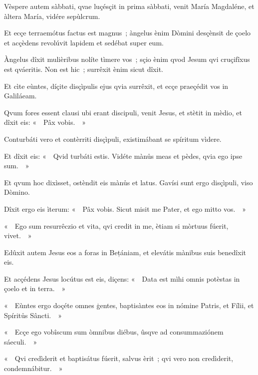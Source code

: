 
Vèspere autem sàbbati, qvae luçésçit in prima sàbbati, venit María Magdaléne, et àltera María, vidére sepùlcrum.

Et ecçe terraemótus factus est magnus~; àngelus ènim Dòmini desçènsit de çoelo et acçèdens revolúvit lapidem et sedébat super eum.

Àngelus dîxit mulièribus nolíte tìmere vos~; sçio ènim qvod Jesum qvi cruçifîxus est qváeritis. Non est hic~; surrêxit ènim sicut dîxit.

Et cìte eùntes, díçite disçìpulis ejus qvia surrêxit, et ecçe praeçédit vos in Galiláeam.

Qvum fores essent clausi ubi erant discipuli, venit Jesus, et stètit in mèdio, et dîxit eis: «~~Pâx vobis.~~»

Conturbáti vero et contèrriti disçìpuli, existimábant se spíritum vìdere.

Et dîxit eis: «~~Qvid turbáti estis. Vidéte mànůs meas et pèdes, qvia ego ipse sum.~~»

Et qvum hoc dixìsset, ostèndit eis mànůs et latus. Gavísi sunt ergo disçìpuli, viso Dòmino.

Dîxit ergo eis ìterum: «~~Pâx vobis. Sicut misit me Pater, et ego mitto vos.~~»

«~~Ego sum resurrêczio et vita, qvi credit in me, ètiam si mòrtuus fúerit, vivet.~~»


Edûxit autem Jesus eos a foras in Bețániam, et elevátis mànibus suis benedîxit eis.

Et acçédens Jesus locútus est eis, diçens: «~~Data est mìhi omnis potèstas in çoelo et in terra.~~»

«~~Eùntes ergo doçéte omnes ģentes, baptisàntes eos in nómine Patris, et Fílii, et Spíritůs Sâncti.~~»

«~~Ecçe ego vobîscum sum òmnibus diébus, ûsqve ad consummaziónem sáeculi.~~»

«~~Qvi credìderit et baptisátus fúerit, salvus èrit~; qvi vero non credìderit, condemnábitur.~~»

